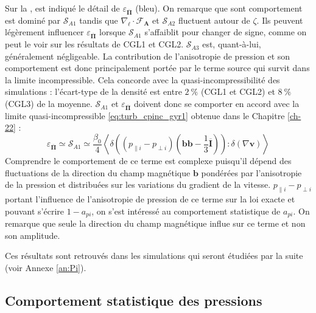  Sur la , est indiqué le détail de $\varepsilon_{\overline{\boldsymbol{\Pi}}}$ (bleu). On remarque que sont comportement est dominé par $\mathcal{S}_{A1}$ tandis que $\nabla_{\boldsymbol{\ell}} \cdot \boldsymbol{\mathcal{F}_A}$ et $\mathcal{S}_{A2}$ fluctuent autour de $\zeta$. Ils peuvent légèrement influencer $\varepsilon_{\overline{\boldsymbol{\Pi}}}$ lorsque $\mathcal{S}_{A1}$ s'affaiblit pour changer de signe, comme on peut le voir sur les résultats de CGL1 et CGL2. $\mathcal{S}_{A3}$ est, quant-à-lui, généralement négligeable. La contribution de l'anisotropie de pression et son comportement est donc principalement portée par le terme source qui survit dans la limite incompressible. Cela concorde avec la quasi-incompressibilité des simulations : l'écart-type de la densité est entre $\SI{2}{\%}$ (CGL1 et CGL2) et $\SI{8}{\%}$ (CGL3) de la moyenne. $\mathcal{S}_{A1}$ et $\varepsilon_{\overline{\boldsymbol{\Pi}}}$ doivent donc se comporter en accord avec la limite quasi-incompressible \eqref{eq:turb_cpinc_gyr1} obtenue dans le Chapitre \ref{ch-22} : 
 \begin{equation}
     \varepsilon_{\overline{\boldsymbol{\Pi}}} \simeq \mathcal{S}_{A1} \simeq \frac{\beta_0}{4}  \left< \delta \left(\left(p_{\parallel i } - p_{\perp i }\right)\left( \boldsymbol{b} \boldsymbol{b} - \frac{1}{3}  \overline{\boldsymbol{I}} \right) \right):\delta \left(\nabla \boldsymbol{v} \right)\right>
 \end{equation}
 Comprendre le comportement de ce terme est complexe puisqu'il dépend des fluctuations de la direction du champ magnétique $\boldsymbol{b}$ pondérées par l'anisotropie de la pression et distribuées sur les variations du gradient de la vitesse. $p_{\parallel i } - p_{\perp i }$ portant l'influence de l'anisotropie de pression de ce terme sur la loi exacte et pouvant s'écrire $1-a_{pi}$, on s'est intéressé au comportement statistique de $a_{pi}$. On remarque que seule la direction du champ magnétique influe sur ce terme et non son amplitude.
 
 Ces résultats sont retrouvés dans les simulations qui seront étudiées par la suite (voir Annexe \ref{an:Pi}).
 
 \subsection{Comportement statistique des pressions}
 
